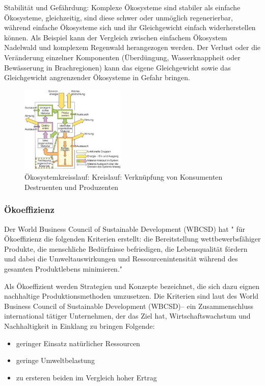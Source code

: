 \documentclass{article}
\begin{document}
Stabilität und Gefährdung: Komplexe Ökosysteme sind stabiler als einfache Ökosysteme, gleichzeitig, sind diese schwer oder unmöglich regenerierbar, während einfache Ökosysteme sich und ihr Gleichgewicht einfach widerherstellen können. Als Beispiel kann der Vergleich zwischen einfachem Ökosystem Nadelwald und komplexem Regenwald herangezogen werden.
Der Verlust oder die Veränderung einzelner Komponenten (Überdüngung, Wasserknappheit oder Bewässerung in Brachregionen) kann das eigene Gleichgewicht sowie das Gleichgewicht angrenzender Ökosysteme in Gefahr bringen. \cite{DefinitionWirtschaftslexikone}

\begin{figure}[htp]
\centering
\includegraphics[width=5cm]{image_folder/oekosystemkreisslauf.png}
\caption{Ökosystemkreisslauf: Kreislauf: Verknüpfung von Konsumenten Destruenten und Produzenten}
\label{fig:Ökosystemkreisslauf}
\end{figure}
        
\subsubsection{Ökoeffizienz}
 Der World Business Council of Sustainable Development (WBCSD) hat " für Ökoeffizienz die folgenden Kriterien erstellt: die Bereitstellung wettbewerbsfähiger Produkte, die menschliche Bedürfnisse befriedigen, die Lebensqualität fördern und dabei die Umweltauswirkungen und Ressourcenintensität während des gesamten Produktlebens minimieren." \cite{OkoeffizienzBrockhaus.de}

Als Ökoeffizient werden Strategien und Konzepte bezeichnet, die sich dazu eignen nachhaltige Produktionsmethoden umzusetzen. Die Kriterien sind laut des World Business Council of Sustainable Development (WBCSD)– ein Zusammenschluss international tätiger Unternehmen, der das Ziel hat, Wirtschaftswachstum und Nachhaltigkeit in Einklang zu bringen Folgende:
\begin{itemize}
\item geringer Einsatz natürlicher Ressourcen
\item geringe Umweltbelastung
\item zu ersteren beiden im Vergleich hoher Ertrag
\end{itemize}
\end{document}
